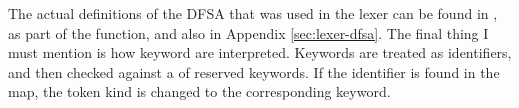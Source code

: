 \begin{figure}[H]
    \centering
\end{figure}

The actual definitions of the DFSA that was used in the lexer can be found in
, as part of the  function, and also in
Appendix \ref{sec:lexer-dfsa}. The final thing I must mention is how keyword are
interpreted. Keywords are treated as identifiers, and then checked against a
 of reserved keywords. If the identifier is found in the map, the
token kind is changed to the corresponding keyword.
